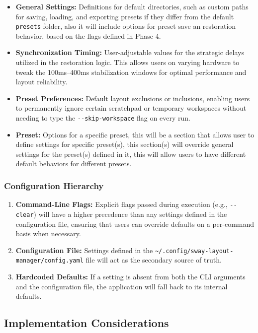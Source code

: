 \begin{itemize}
    \item \textbf{General Settings:} Definitions for default directories, such as custom paths for saving, loading, and exporting presets if they differ from the default \texttt{presets} folder, also it will include options for preset save an restoration behavior, based on the flags defined in Phase 4.
    \item \textbf{Synchronization Timing:} User-adjustable values for the strategic delays utilized in the restoration logic. This allows users on varying hardware to tweak the 100ms--400ms stabilization windows for optimal performance and layout reliability.
    \item \textbf{Preset Preferences:} Default layout exclusions or inclusions, enabling users to permanently ignore certain scratchpad or temporary workspaces without needing to type the \texttt{-{}-skip-workspace} flag on every run.
    \item \textbf{Preset:} Options for a specific preset, this will be a section that allows user to define settings for specific preset(s), this section(s) will override general settings for the preset(s) defined in it, this will allow users to have different default behaviors for different presets.
\end{itemize}

\subsubsection{Configuration Hierarchy}

\begin{enumerate}
    \item \textbf{Command-Line Flags:} Explicit flags passed during execution (e.g., \texttt{-{}-clear}) will have a higher precedence than any settings defined in the configuration file, ensuring that users can override defaults on a per-command basis when necessary.
    \item \textbf{Configuration File:} Settings defined in the \texttt{\~{}/.config/sway-layout-manager/config.yaml} file will act as the secondary source of truth.
    \item \textbf{Hardcoded Defaults:} If a setting is absent from both the CLI arguments and the configuration file, the application will fall back to its internal defaults.
\end{enumerate}

\subsection{Implementation Considerations}


